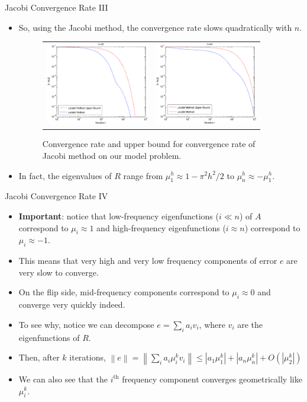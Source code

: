 \documentclass{beamer}
\providecommand{\abs}[1]{\left\lvert #1 \right\rvert}
\providecommand{\norm}[1]{\left\lVert #1 \right\rVert}
\begin{document}
\begin{frame}{Jacobi Convergence Rate III}
 \begin{itemize}
  \item So, using the Jacobi method, the convergence rate slows quadratically
        with $n$.
  \begin{figure}
   \begin{tabular}{cc}
    \includegraphics[width=4.5cm]{images/jacobiConvergence_32.pdf} & \includegraphics[width=4.5cm]{images/jacobiConvergence_64.pdf}
   \end{tabular}
   \caption{Convergence rate and upper bound for convergence rate of Jacobi
            method on our model problem.}
  \end{figure}
  \item In fact, the eigenvalues of $R$ range from $\mu_1^h \approx 1-\pi^2h^2/2$
        to $\mu_n^h \approx -\mu_1^h$.
 \end{itemize}
\end{frame}

\begin{frame}{Jacobi Convergence Rate IV}
 \begin{itemize}
  \item \textbf{Important}: notice that low-frequency eigenfunctions ($i\ll n$)
        of $A$ correspond to $\mu_i \approx 1$ and high-frequency eigenfunctions
        ($i \approx n$) correspond to $\mu_i \approx -1$.
  \item This means that very high and very low frequency components of error $e$
        are very slow to converge.
  \item On the flip side, mid-frequency components correspond to
        $\mu_i \approx 0$ and converge very quickly indeed.
  \item To see why, notice we can decompose $e = \sum_i a_i v_i$, where $v_i$
        are the eigenfunctions of $R$.
  \item Then, after $k$ iterations, $\norm{e} = \norm{\sum_i a_i \mu_i^k v_i} \leq \abs{a_1\mu_1^k} + \abs{a_n\mu_n^k} + O(\abs{\mu_2^k})$
  \item We can also see that the $i^\text{th}$ frequency component converges
        geometrically like $\mu_i^k$.
 \end{itemize}
\end{frame}
\end{document}
